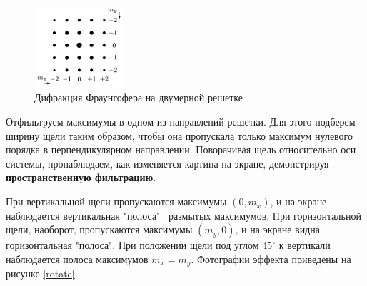 \documentclass[12pt]{kiarticle}
\begin{document}
	\begin{figure}[h]
		\centering	
		\includegraphics[width=0.3\textwidth]{2d.png}
		\caption{Дифракция Фраунгофера на двумерной решетке}
		\label{2d}
	\end{figure}
	
	Отфильтруем максимумы в одном из направлений решетки. Для этого подберем ширину щели таким образом, чтобы она пропускала только максимум нулевого порядка в перпендикулярном направлении. Поворачивая щель относительно оси системы, пронаблюдаем, как изменяется картина на экране, демонстрируя \textbf{пространственную фильтрацию}. 
	
	При вертикальной щели пропускаются максимумы $(0, m_x)$, и на экране наблюдается вертикальная "полоса" \ размытых максимумов. При горизонтальной щели, наоборот, пропускаются максимумы $(m_y, 0)$, и на экране видна горизонтальная "полоса". При положении щели под углом $45^\circ$ к вертикали наблюдается полоса максимумов $m_x = m_y$. Фотографии эффекта приведены на рисунке \ref{rotate}. 
	
\end{document}
